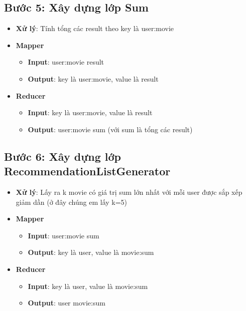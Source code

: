 \subsection*{Bước 5: Xây dựng lớp Sum}
\begin{itemize}
    \item \textbf{Xử lý}: Tính tổng các result theo key là user:movie
    \item \textbf{Mapper}
          \begin{itemize}
              \item \textbf{Input}: user:movie \quad result \\
              \item \textbf{Output}: key là user:movie, value là result \\
          \end{itemize}
    \item \textbf{Reducer}
          \begin{itemize}
              \item \textbf{Input}: key là user:movie, value là result \\
              \item \textbf{Output}: user:movie \quad sum (với sum là tổng các result) \\
          \end{itemize}
\end{itemize}
\subsection*{Bước 6: Xây dựng lớp RecommendationListGenerator}
\begin{itemize}
    \item \textbf{Xử lý}: Lấy ra k movie có giá trị sum lớn nhất với mỗi user được sắp xếp giảm dần (ở đây chúng em lấy k=5)
    \item \textbf{Mapper}
          \begin{itemize}
              \item \textbf{Input}: user:movie \quad sum \\
              \item \textbf{Output}: key là user, value là movie:sum \\
          \end{itemize}
    \item \textbf{Reducer}
          \begin{itemize}
              \item \textbf{Input}: key là user, value là movie:sum \\
              \item \textbf{Output}: user \quad movie:sum
          \end{itemize}
\end{itemize}
